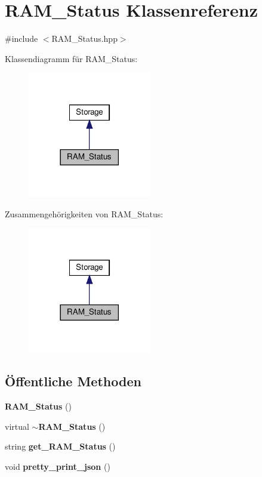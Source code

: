 \section{R\+A\+M\+\_\+\+Status Klassenreferenz}
\label{class_r_a_m___status}


{\ttfamily \#include $<$R\+A\+M\+\_\+\+Status.\+hpp$>$}



Klassendiagramm für R\+A\+M\+\_\+\+Status\+:\nopagebreak
\begin{figure}[H]
\begin{center}
\leavevmode
\includegraphics[width=153pt]{class_r_a_m___status__inherit__graph}
\end{center}
\end{figure}


Zusammengehörigkeiten von R\+A\+M\+\_\+\+Status\+:\nopagebreak
\begin{figure}[H]
\begin{center}
\leavevmode
\includegraphics[width=153pt]{class_r_a_m___status__coll__graph}
\end{center}
\end{figure}
\subsection*{Öffentliche Methoden}
\begin{DoxyCompactItemize}
\item 
\textbf{ R\+A\+M\+\_\+\+Status} ()
\item 
virtual \textbf{ $\sim$\+R\+A\+M\+\_\+\+Status} ()
\item 
string \textbf{ get\+\_\+\+R\+A\+M\+\_\+\+Status} ()
\item 
void \textbf{ pretty\+\_\+print\+\_\+json} ()
\end{DoxyCompactItemize}

